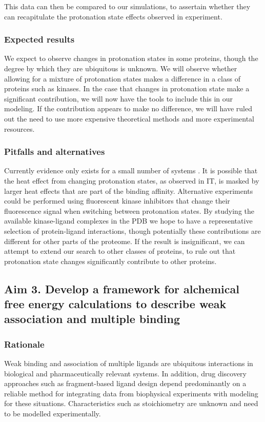 \documentclass[10pt,final]{article}
\newcommand{\pH}{$\mathrm{pH}$\ }
\begin{document}
This data can then be compared to our simulations, to assertain whether they can recapitulate the protonation state effects observed in experiment.

\todo[inline,color=violet!40]{short explanation constant-\pH simulations}

\subsubsection*{Expected results}
We expect to observe changes in protonation states in some proteins, though the degree by which they are ubiquitous is unknown. We will observe whether allowing for a mixture of protonation states makes a difference in a class of proteins such as kinases. In the case that changes in protonation state make a significant contribution, we will now have the tools to include this in our modeling. If the contribution appears to make no difference, we will have ruled out the need to use more expensive theoretical methods and more experimental resources.

\subsubsection*{Pitfalls and alternatives}
Currently evidence only exists for a small number of systems \cite{Aleksandrov2007a,Czodrowski2007a}. It is possible that the heat effect from changing protonation states, as observed in IT, is masked by larger heat effects that are part of the binding affinity. Alternative experiments could be performed using fluorescent kinase inhibitors that change their fluorescence signal when switching between protonation states.
By studying the available kinase-ligand complexes in the PDB we hope to have a representative selection of protein-ligand interactions, though potentially these contributions are different for other parts of the proteome. If the result is insignificant, we can attempt to extend our search to other classes of proteins, to rule out that protonation state changes significantly contribute to other proteins.

\subsection*{Aim 3. Develop a framework for alchemical free energy calculations to describe weak association and multiple binding}
\subsubsection*{Rationale}
Weak binding and association of multiple ligands are ubiquitous interactions in biological and pharmaceutically relevant systems.
In addition, drug discovery approaches such as fragment-based ligand design depend predominantly on a reliable method for integrating data from biophysical experiments with modeling for these situations. Characteristics such as stoichiometry are unknown and need to be modelled experimentally.
\end{document}
